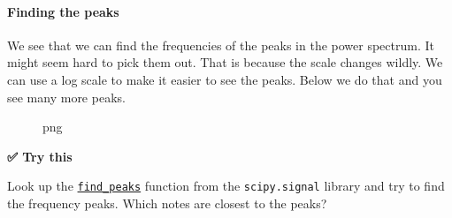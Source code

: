 \paragraph{Finding the peaks}\label{finding-the-peaks}

We see that we can find the frequencies of the peaks in the power
spectrum. It might seem hard to pick them out. That is because the scale
changes wildly. We can use a log scale to make it easier to see the
peaks. Below we do that and you see many more peaks.

\begin{Shaded}
\begin{Highlighting}[]
\OperatorTok{=}\NormalTok{(}\NormalTok{, }\NormalTok{))}

\NormalTok{plt.plot(freqs[:num\_samples}\OperatorTok{//}\NormalTok{], np.log(one\_sided\_power\_spectrum))}
\NormalTok{, }\NormalTok{)}

\NormalTok{)}
\NormalTok{)}

\end{Highlighting}
\end{Shaded}

\begin{figure}
\centering
{}
\caption{png}
\end{figure}

\textbf{✅ Try this}

Look up the
\href{https://docs.scipy.org/doc/scipy/reference/generated/scipy.signal.find_peaks.html}{\texttt{find\_peaks}}
function from the \texttt{scipy.signal} library and try to find the
frequency peaks. Which notes are closest to the peaks?

